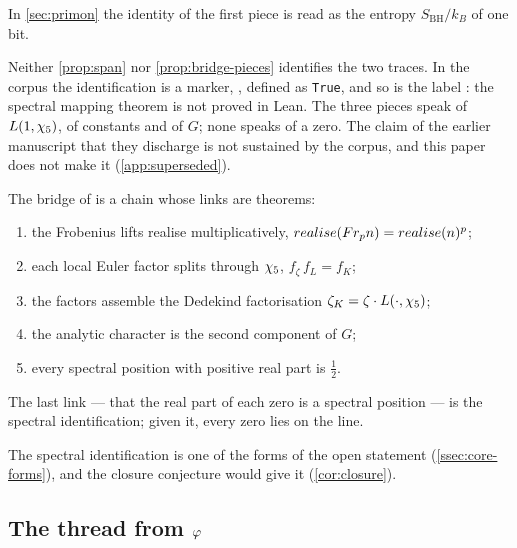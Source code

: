 In \cref{sec:primon} the identity of the first piece is read as the entropy $S_{\mathrm{BH}}/k_B$ of one bit.

\begin{remark}\label{rmk:markers}
Neither \cref{prop:span} nor \cref{prop:bridge-pieces} identifies the two traces.
In the corpus the identification is a marker, ,
defined as \texttt{True}, and so is the label : the
spectral mapping theorem is not proved in Lean.  The three pieces speak of
$L(1,\chi_5)$, of constants and of $G$; none speaks of a zero.  The claim of the
earlier manuscript that they discharge  is not sustained
by the corpus, and this paper does not make it (\cref{app:superseded}).
\end{remark}

\begin{proposition}\label{prop:bridge-links}
The bridge of \cite{gonzalez25hp} is a chain whose links are theorems:
\begin{enumerate}[label=\textup{(\roman*)}]
  \item the Frobenius lifts realise multiplicatively, $realise(Fr_p n)=realise(n)^p$;
  \item each local Euler factor splits through $\chi_5$, $f_\zeta\,f_L=f_K$;
  \item the factors assemble the Dedekind factorisation $\zeta_K=\zeta\cdot L(\cdot,\chi_5)$;
  \item the analytic character is the second component of $G$;
  \item every spectral position with positive real part is $\tfrac12$.
\end{enumerate}
The last link --- that the real part of each zero is a spectral position --- is the spectral
identification; given it, every zero lies on the line.
%
\end{proposition}

The spectral identification is one of the forms of the open statement (\cref{ssec:core-forms}), and the
closure conjecture would give it (\cref{cor:closure}).

\subsection{The thread from $\varphi$}\label{sec:topological-proof}

